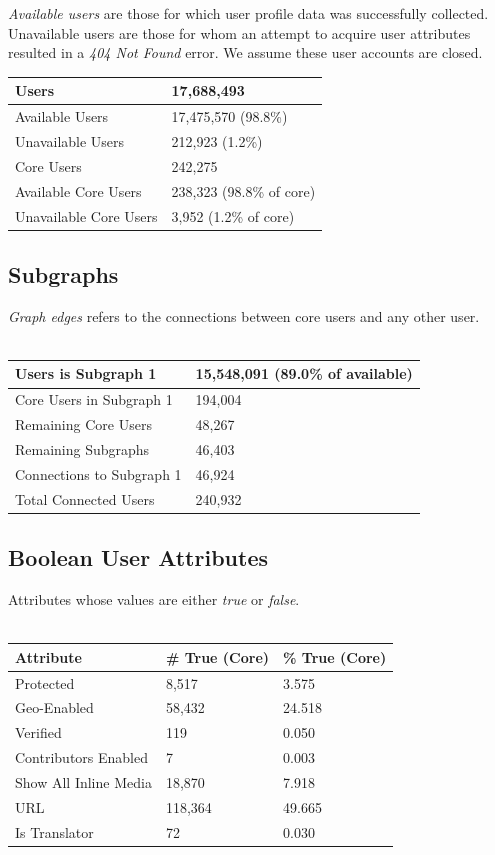 
\textit{Available users} are those for which user profile data was successfully collected.  Unavailable users are those for whom an attempt to acquire user attributes resulted in a \textit{404 Not Found} error.  We assume these user accounts are closed.\\ 
\begin{tabular}[t]{| l | l |}
\hline
Users & 17,688,493  \\ \hline
Available Users & 17,475,570 (98.8\%) \\ \hline
Unavailable Users & 212,923 (1.2\%) \\ \hline
Core Users & 242,275 \\ \hline
Available Core Users & 238,323 (98.8\% of core) \\ \hline
Unavailable Core Users & 3,952 (1.2\% of core) \\ \hline
\end{tabular}

\subsection{Subgraphs}
\textit{Graph edges} refers to the connections between core users and any other user.\\\\
\begin{tabular}{| l | l | }
\hline
Users is Subgraph 1 & 15,548,091 (89.0\% of available) \\ \hline
Core Users in Subgraph 1  & 194,004 \\ \hline
Remaining Core Users  & 48,267 \\ \hline
Remaining Subgraphs  & 46,403 \\ \hline
Connections to Subgraph 1  & 46,924 \\ \hline
Total Connected Users & 240,932 \\ \hline
\end{tabular}

\subsection{Boolean User Attributes}
Attributes whose values are either \textit{true} or \textit{false}.\\\\
\begin{tabular}{| l | l | l |}
\hline
\textbf{Attribute} & \textbf{\# True (Core)} & \textbf{\% True (Core)} \\ \hline
Protected & 8,517 & 3.575  \\ \hline
Geo-Enabled & 58,432 & 24.518 \\ \hline
Verified & 119 & 0.050 \\ \hline
Contributors Enabled & 7 & 0.003 \\ \hline
Show All Inline Media & 18,870 & 7.918 \\ \hline
URL & 118,364 & 49.665 \\ \hline
Is Translator & 72 & 0.030 \\ \hline
\end{tabular}

